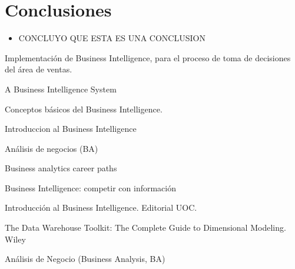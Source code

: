 \documentclass[twoside,twocolumn]{article}
\begin{document}


\section{Conclusiones}
\begin{itemize}	
	\item CONCLUYO QUE ESTA ES UNA CONCLUSION

\end{itemize} 





\begin{thebibliography}{99} 

\newblock Implementación de Business Intelligence, para el proceso de toma de decisiones del área de ventas.

\newblock A Business Intelligence System

Conceptos básicos del Business Intelligence.

\newblock Introduccion al Business Intelligence

\newblock Análisis de negocios (BA)

\newblock Business analytics career paths

\newblock Business Intelligence: competir con información


\bibitem[Curto J., 2010]{} 
\newblock Introducción al Business Intelligence. Editorial UOC.

\newblock  The Data Warehouse Toolkit: The Complete Guide to Dimensional Modeling. Wiley

\bibitem[Carolina A., 2017]{} 
\newblock  Análisis de Negocio (Business Analysis, BA)
 
\end{thebibliography}


\end{document}
